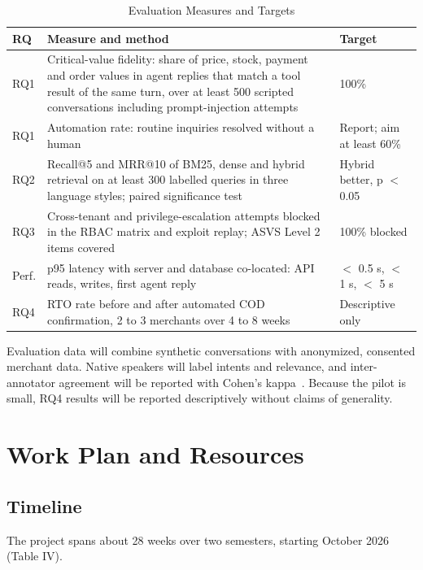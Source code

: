 \documentclass[conference,a4paper]{IEEEtran}
\begin{document}
\begin{table}[!t]
\renewcommand{\arraystretch}{1.2}
\caption{Evaluation Measures and Targets}
\label{tab:3}
\centering\footnotesize
\begin{tabular}{|p{}|p{}|p{}|}
\hline
\textbf{RQ} & \textbf{Measure and method} & \textbf{Target} \\
\hline
RQ1 & Critical-value fidelity: share of price, stock, payment and order values in agent replies that match a tool result of the same turn, over at least 500 scripted conversations including prompt-injection attempts & 100\% \\
\hline
RQ1 & Automation rate: routine inquiries resolved without a human & Report; aim at least 60\% \\
\hline
RQ2 & Recall@5 and MRR@10 of BM25, dense and hybrid retrieval on at least 300 labelled queries in three language styles; paired significance test~\cite{smucker} & Hybrid better, p $<$ 0.05 \\
\hline
RQ3 & Cross-tenant and privilege-escalation attempts blocked in the RBAC matrix and exploit replay; ASVS Level 2 items covered & 100\% blocked \\
\hline
Perf. & p95 latency with server and database co-located: API reads, writes, first agent reply & $<$ 0.5 s, $<$ 1 s, $<$ 5 s \\
\hline
RQ4 & RTO rate before and after automated COD confirmation, 2 to 3 merchants over 4 to 8 weeks & Descriptive only \\
\hline
\end{tabular}
\end{table}

Evaluation data will combine synthetic conversations with anonymized, consented merchant data. Native speakers will label intents and relevance, and inter-annotator agreement will be reported with Cohen's kappa~\cite{cohen}. Because the pilot is small, RQ4 results will be reported descriptively without claims of generality.


\section{Work Plan and Resources}
\subsection{Timeline}
The project spans about 28 weeks over two semesters, starting October 2026 (Table IV).
\end{document}
